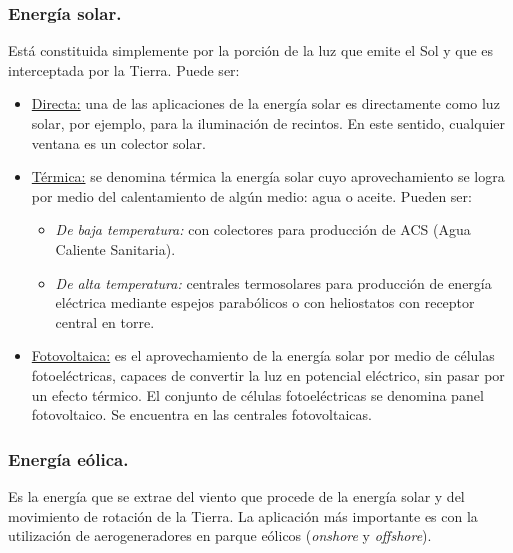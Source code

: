 			\subsubsection{Energía solar.}
				Está constituida simplemente por la porción de la luz que emite el Sol y que es	interceptada por la Tierra. Puede ser:
				\begin{itemize}
					\item \underline{Directa:}
						una de las aplicaciones de la energía solar es directamente como luz solar, por ejemplo, para la iluminación de recintos. En este sentido, cualquier ventana es un colector solar.
					\item \underline{Térmica:}
						se denomina térmica la energía solar cuyo aprovechamiento se logra por medio del
						calentamiento de algún medio: agua o aceite. Pueden ser:
						\begin{itemize}
							\item \textit{De baja temperatura:} 
								con colectores para producción de ACS (Agua Caliente Sanitaria).
							\item \textit{De alta temperatura:} 
								centrales termosolares para producción de energía eléctrica mediante espejos parabólicos o con heliostatos con receptor central en torre.
						\end{itemize}
					\item \underline{Fotovoltaica:}
						es el aprovechamiento de la energía solar por medio de células fotoeléctricas,
						capaces de convertir la luz en potencial eléctrico, sin pasar por un efecto térmico. El conjunto de
						células fotoeléctricas se denomina panel fotovoltaico. Se encuentra en las centrales fotovoltaicas.
				\end{itemize}
				
			\subsubsection{Energía eólica.}
				Es la energía que se extrae del viento que procede de la energía solar y del movimiento de rotación
				de la Tierra. La aplicación más importante es con la utilización de aerogeneradores en parque eólicos (\textit{onshore} y \textit{offshore}).
